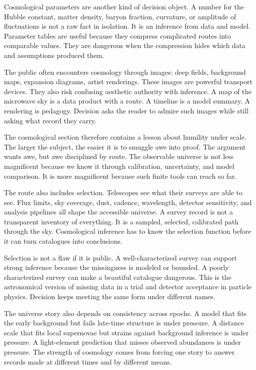 Cosmological parameters are another kind of decision object. A number for the
Hubble constant, matter density, baryon fraction, curvature, or amplitude of
fluctuations is not a raw fact in isolation. It is an inference from data and
model. Parameter tables are useful because they compress complicated routes
into comparable values. They are dangerous when the compression hides which
data and assumptions produced them.

The public often encounters cosmology through images: deep fields, background
maps, expansion diagrams, artist renderings. These images are powerful
transport devices. They also risk confusing aesthetic authority with
inference. A map of the microwave sky is a data product with a route. A
timeline is a model summary. A rendering is pedagogy. Decision asks the
reader to admire such images while still asking what record they carry.

The cosmological section therefore contains a lesson about humility under
scale. The larger the subject, the easier it is to smuggle awe into proof.
The argument wants awe, but awe disciplined by route. The observable
universe is not less magnificent because we know it through calibration,
uncertainty, and model comparison. It is more magnificent because such finite
tools can reach so far.

The route also includes selection. Telescopes see what their surveys are able
to see. Flux limits, sky coverage, dust, cadence, wavelength, detector
sensitivity, and analysis pipelines all shape the accessible universe. A
survey record is not a transparent inventory of everything. It is a sampled,
selected, calibrated path through the sky. Cosmological inference has to know
the selection function before it can turn catalogues into conclusions.

Selection is not a flaw if it is public. A well-characterized survey can
support strong inference because the missingness is modeled or bounded. A
poorly characterized survey can make a beautiful catalogue dangerous. This is
the astronomical version of missing data in a trial and detector acceptance in
particle physics. Decision keeps meeting the same form under different names.

The universe story also depends on consistency across epochs. A model that
fits the early background but fails late-time structure is under pressure. A
distance scale that fits local supernovae but strains against background
inference is under pressure. A light-element prediction that misses observed
abundances is under pressure. The strength of cosmology comes from forcing
one story to answer records made at different times and by different means.

